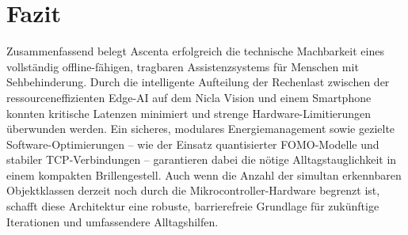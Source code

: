 \chapter{Fazit}

Zusammenfassend belegt Ascenta erfolgreich die technische Machbarkeit eines vollständig offline-fähigen, tragbaren Assistenzsystems für Menschen mit Sehbehinderung. Durch die intelligente Aufteilung der Rechenlast zwischen der ressourceneffizienten Edge-AI auf dem Nicla Vision und einem Smartphone konnten kritische Latenzen minimiert und strenge Hardware-Limitierungen überwunden werden. Ein sicheres, modulares Energiemanagement sowie gezielte Software-Optimierungen – wie der Einsatz quantisierter FOMO-Modelle und stabiler TCP-Verbindungen – garantieren dabei die nötige Alltagstauglichkeit in einem kompakten Brillengestell. Auch wenn die Anzahl der simultan erkennbaren Objektklassen derzeit noch durch die Mikrocontroller-Hardware begrenzt ist, schafft diese Architektur eine robuste, barrierefreie Grundlage für zukünftige Iterationen und umfassendere Alltagshilfen.